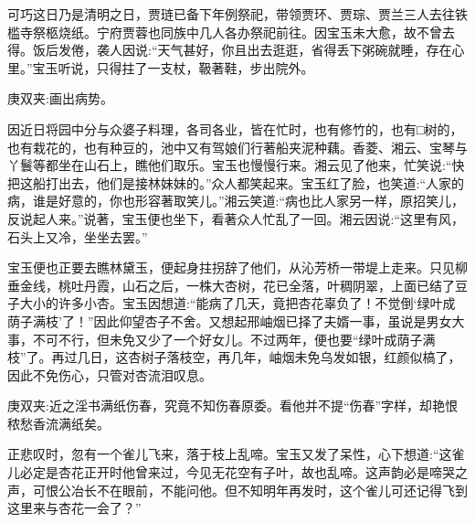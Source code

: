 \begin{parag}
    可巧这日乃是清明之日，贾琏已备下年例祭祀，带领贾环、贾琮、贾兰三人去往铁槛寺祭柩烧纸。宁府贾蓉也同族中几人各办祭祀前往。因宝玉未大愈，故不曾去得。饭后发倦，袭人因说:“天气甚好，你且出去逛逛，省得丢下粥碗就睡，存在心里。”宝玉听说，只得拄了一支杖，靸著鞋，步出院外。\begin{note}庚双夹:画出病势。\end{note}因近日将园中分与众婆子料理，各司各业，皆在忙时，也有修竹的，也有□树的，也有栽花的，也有种豆的，池中又有驾娘们行著船夹泥种藕。香菱、湘云、宝琴与丫鬟等都坐在山石上，瞧他们取乐。宝玉也慢慢行来。湘云见了他来，忙笑说:“快把这船打出去，他们是接林妹妹的。”众人都笑起来。宝玉红了脸，也笑道:“人家的病，谁是好意的，你也形容著取笑儿。”湘云笑道:“病也比人家另一样，原招笑儿，反说起人来。”说著，宝玉便也坐下，看著众人忙乱了一回。湘云因说:“这里有风，石头上又冷，坐坐去罢。”
\end{parag}


\begin{parag}
    宝玉便也正要去瞧林黛玉，便起身拄拐辞了他们，从沁芳桥一带堤上走来。只见柳垂金线，桃吐丹霞，山石之后，一株大杏树，花已全落，叶稠阴翠，上面已结了豆子大小的许多小杏。宝玉因想道:“能病了几天，竟把杏花辜负了！不觉倒‘绿叶成荫子满枝’了！”因此仰望杏子不舍。又想起邢岫烟已择了夫婿一事，虽说是男女大事，不可不行，但未免又少了一个好女儿。不过两年，便也要“绿叶成荫子满枝”了。再过几日，这杏树子落枝空，再几年，岫烟未免乌发如银，红颜似槁了，因此不免伤心，只管对杏流泪叹息。\begin{note}庚双夹:近之淫书满纸伤春，究竟不知伤春原委。看他并不提“伤春”字样，却艳恨秾愁香流满纸矣。\end{note}正悲叹时，忽有一个雀儿飞来，落于枝上乱啼。宝玉又发了呆性，心下想道:“这雀儿必定是杏花正开时他曾来过，今见无花空有子叶，故也乱啼。这声韵必是啼哭之声，可恨公冶长不在眼前，不能问他。但不知明年再发时，这个雀儿可还记得飞到这里来与杏花一会了？”
\end{parag}


